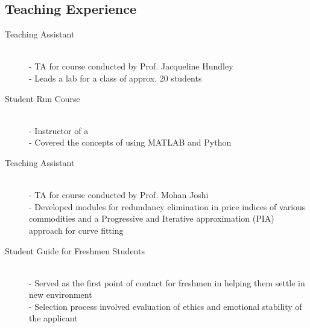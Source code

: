 \documentclass[mm]{simple_style}
\begin{document}
\begin{resume}
\vspace{-1ex}
\section{Teaching Experience}
\begin{description}
\item[Teaching Assistant]\ \\
- TA for  course conducted by Prof. Jacqueline Hundley\\
- Leads a lab for a class of approx. 20 students
\item[Student Run Course]\ \\
- Instructor of a \\ %
- Covered the concepts of  using MATLAB and Python
\item[Teaching Assistant]\ \\
- TA for  course conducted by Prof. Mohan Joshi\\
- Developed modules for redundancy elimination in price indices of various commodities and a Progressive and Iterative approximation (PIA) approach for curve fitting  
\item[Student Guide for Freshmen Students]\ \\
- Served as the first point of contact for freshmen in helping them settle in new environment\\
- Selection process involved evaluation of ethics and emotional stability of the applicant 
\end{description}

\iffalse
\vspace{-2ex}
\sectionline

\vspace{-1ex}

\end{resume}
\end{document}
